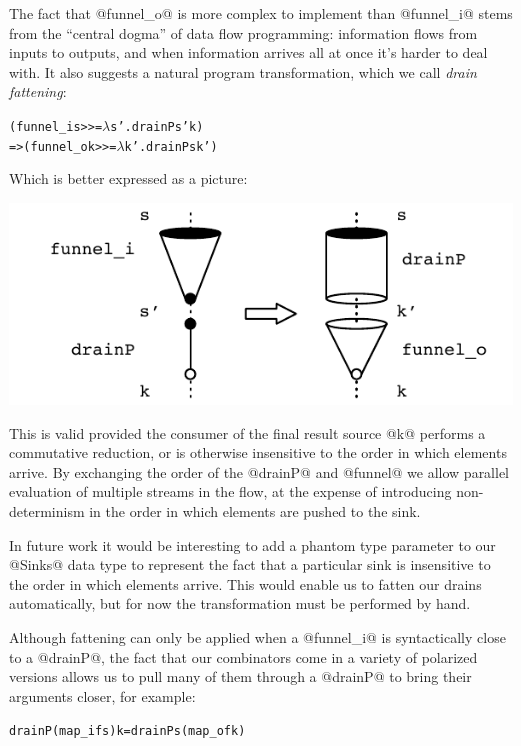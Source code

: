 The fact that @funnel_o@ is more complex to implement than @funnel_i@ stems from the ``central dogma'' of data flow programming: information flows from inputs to outputs, and when information arrives all at once it's harder to deal with. It also suggests a natural program transformation, which we call \emph{drain fattening}:
\begin{alltt}
        (funnel_i s >>= \(\lambda\)s'. drainP s' k)
     => (funnel_o k >>= \(\lambda\)k'. drainP s  k')
\end{alltt}

Which is better expressed as a picture:
\begin{center}
\includegraphics[scale=0.8]{figures/drain-fatten.pdf}
\end{center}

This is valid provided the consumer of the final result source @k@ performs a commutative reduction, or is otherwise insensitive to the order in which elements arrive. By exchanging the order of the @drainP@ and @funnel@ we allow parallel evaluation of multiple streams in the flow, at the expense of introducing non-determinism in the order in which elements are pushed to the sink.

In future work it would be interesting to add a phantom type parameter to our @Sinks@ data type to represent the fact that a particular sink is insensitive to the order in which elements arrive. This would enable us to fatten our drains automatically, but for now the transformation must be performed by hand.

Although fattening can only be applied when a @funnel_i@ is syntactically close to a @drainP@, the fact that our combinators come in a variety of polarized versions allows us to pull many of them through a @drainP@ to bring their arguments closer, for example:
\begin{alltt}
  drainP (map_i f s) k  =  drainP s (map_o f k)
\end{alltt}


\eject

